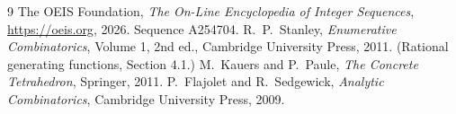 \documentclass[11pt,a4paper]{article}
\theoremstyle{plain}
\theoremstyle{definition}
\begin{document}
\begin{thebibliography}{9}
 The OEIS Foundation, \emph{The On-Line Encyclopedia of Integer
Sequences}, \url{https://oeis.org}, 2026. Sequence A254704.
 R.~P.~Stanley, \emph{Enumerative Combinatorics}, Volume 1, 2nd ed.,
Cambridge University Press, 2011. (Rational generating functions, Section 4.1.)
 M.~Kauers and P.~Paule, \emph{The Concrete Tetrahedron}, Springer, 2011.
 P.~Flajolet and R.~Sedgewick, \emph{Analytic Combinatorics}, Cambridge
University Press, 2009.
\end{thebibliography}
\end{document}
